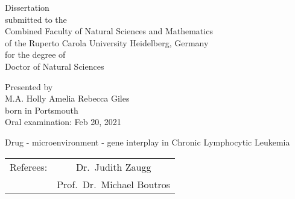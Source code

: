 \documentclass[11pt, a4paper, twosided]{book}
\begin{document}

\thispagestyle{empty}
  \begin{center}
  {\Large{Dissertation\\
    submitted to the\\
    Combined Faculty of Natural Sciences and Mathematics\\
    of the Ruperto Carola University Heidelberg, Germany\\
    for the degree of\\
    Doctor of Natural Sciences\\}} \vspace*{\fill}

  \Large{Presented by} \\\vspace{0.5cm}
  \Large{M.A. Holly Amelia Rebecca Giles} \\
  \Large{born in Portsmouth} \\
  \Large{Oral examination: Feb 20, 2021}

\end{center}
\newpage\null\thispagestyle{empty}\newpage


\pagebreak
\thispagestyle{empty}
\null
\begin{center}
\Large{Drug - microenvironment - gene interplay in Chronic Lymphocytic Leukemia} \\
\vspace*{\fill}
\begin{tabular}{ c c }
Referees: & Dr.~Judith Zaugg \\
          & Prof.~Dr.~Michael Boutros
\end{tabular}
\end{center}
\newpage\null\thispagestyle{empty}\newpage

\end{document}
